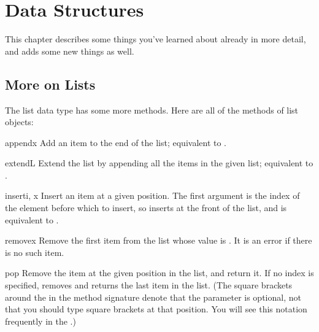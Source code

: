 \documentclass{manual}
\begin{document}
\chapter{Data Structures \label{structures}}

This chapter describes some things you've learned about already in
more detail, and adds some new things as well.


\section{More on Lists \label{moreLists}}

The list data type has some more methods.  Here are all of the methods
of list objects:

\begin{methoddesc}[list]{append}{x}
Add an item to the end of the list;
equivalent to .
\end{methoddesc}

\begin{methoddesc}[list]{extend}{L}
Extend the list by appending all the items in the given list;
equivalent to .
\end{methoddesc}

\begin{methoddesc}[list]{insert}{i, x}
Insert an item at a given position.  The first argument is the index
of the element before which to insert, so 
inserts at the front of the list, and 
is equivalent to .
\end{methoddesc}

\begin{methoddesc}[list]{remove}{x}
Remove the first item from the list whose value is .
It is an error if there is no such item.
\end{methoddesc}

\begin{methoddesc}[list]{pop}{}
Remove the item at the given position in the list, and return it.  If
no index is specified,  removes and returns the last item
in the list.  (The square brackets
around the  in the method signature denote that the parameter
is optional, not that you should type square brackets at that
position.  You will see this notation frequently in the
.)
\end{methoddesc}
\end{document}
